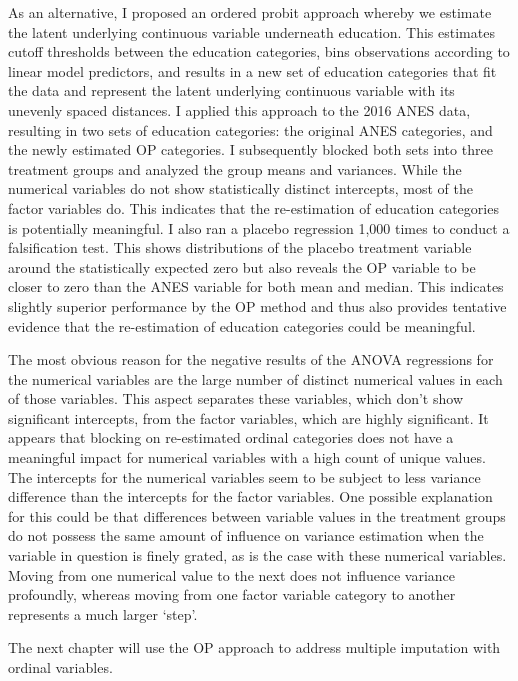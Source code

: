 \documentclass[12pt,econ]{sources/authesis}
\begin{document}
As an alternative, I proposed an ordered probit approach whereby we estimate the latent underlying continuous variable underneath education. This estimates cutoff thresholds between the education categories, bins observations according to linear model predictors, and results in a new set of education categories that fit the data and represent the latent underlying continuous variable with its unevenly spaced distances. I applied this approach to the 2016 ANES data, resulting in two sets of education categories: the original ANES categories, and the newly estimated OP categories. I subsequently blocked both sets into three treatment groups and analyzed the group means and variances. While the numerical variables do not show statistically distinct intercepts, most of the factor variables do. This indicates that the re-estimation of education categories is potentially meaningful. I also ran a placebo regression 1,000 times to conduct a falsification test. This shows distributions of the placebo treatment variable around the statistically expected zero but also reveals the OP variable to be closer to zero than the ANES variable for both mean and median. This indicates slightly superior performance by the OP method and thus also provides tentative evidence that the re-estimation of education categories could be meaningful.

The most obvious reason for the negative results of the ANOVA regressions for the numerical variables are the large number of distinct numerical values in each of those variables. This aspect separates these variables, which don't show significant intercepts, from the factor variables, which are highly significant. It appears that blocking on re-estimated ordinal categories does not have a meaningful impact for numerical variables with a high count of unique values. The intercepts for the numerical variables seem to be subject to less variance difference than the intercepts for the factor variables. One possible explanation for this could be that differences between variable values in the treatment groups do not possess the same amount of influence on variance estimation when the variable in question is finely grated, as is the case with these numerical variables. Moving from one numerical value to the next does not influence variance profoundly, whereas moving from one factor variable category to another represents a much larger `step'.

The next chapter will use the OP approach to address multiple imputation with ordinal variables.
\end{document}
